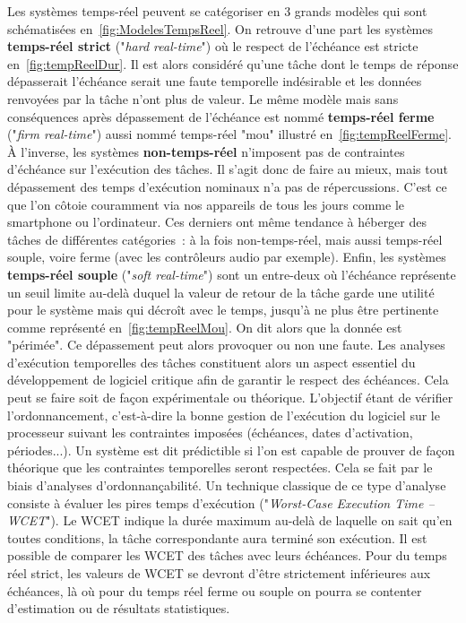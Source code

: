 \documentclass[french, a4paper, 11pt, twoside, pdftex]{StyleThese}
\begin{document}
		Les systèmes temps-réel peuvent se catégoriser en 3 grands modèles qui sont schématisées en~\autoref{fig:ModelesTempsReel}. On retrouve d'une part les systèmes \textbf{temps-réel strict} ("\textit{hard real-time}") où le respect de l'échéance est stricte en~\autoref{fig:tempReelDur}. Il est alors considéré qu'une tâche dont le temps de réponse dépasserait l'échéance serait une faute temporelle indésirable et les données renvoyées par la tâche n'ont plus de valeur. Le même modèle mais sans conséquences après dépassement de l'échéance est nommé \textbf{temps-réel ferme} ("\textit{firm real-time}") aussi nommé temps-réel "mou" illustré en~\autoref{fig:tempReelFerme}. À l'inverse, les systèmes \textbf{non-temps-réel} n'imposent pas de contraintes d'échéance sur l'exécution des tâches. Il s'agit donc de faire au mieux, mais tout dépassement des temps d'exécution nominaux n'a pas de répercussions. C'est ce que l'on côtoie couramment via nos appareils de tous les jours comme le smartphone ou l'ordinateur. Ces derniers ont même tendance à héberger des tâches de différentes catégories~: à la fois non-temps-réel, mais aussi temps-réel souple, voire ferme (avec les contrôleurs audio par exemple). Enfin, les systèmes \textbf{temps-réel souple} ("\textit{soft real-time}") sont un entre-deux où l'échéance représente un seuil limite au-delà duquel la valeur de retour de la tâche garde une utilité pour le système mais qui décroît avec le temps, jusqu'à ne plus être pertinente comme représenté en~\autoref{fig:tempReelMou}. On dit alors que la donnée est "périmée". Ce dépassement peut alors provoquer ou non une faute.
		Les analyses d'exécution temporelles des tâches constituent alors un aspect essentiel du développement de logiciel critique afin de garantir le respect des échéances. Cela peut se faire soit de façon expérimentale ou théorique. L'objectif étant de vérifier l'ordonnancement, c'est-à-dire la bonne gestion de l'exécution du logiciel sur le processeur suivant les contraintes imposées (échéances, dates d'activation, périodes...). Un système est dit prédictible si l'on est capable de prouver de façon théorique que les contraintes temporelles seront respectées. Cela se fait par le biais d'analyses d'ordonnançabilité. Un technique classique de ce type d'analyse consiste à évaluer les pires temps d'exécution ("\textit{Worst-Case Execution Time -- WCET}"). Le WCET indique la durée maximum au-delà de laquelle on sait qu'en toutes conditions, la tâche correspondante aura terminé son exécution. Il est possible de comparer les WCET des tâches avec leurs échéances. Pour du temps réel strict, les valeurs de WCET se devront d'être strictement inférieures aux échéances, là où pour du temps réel ferme ou souple on pourra se contenter d'estimation ou de résultats statistiques.
				
\end{document}
